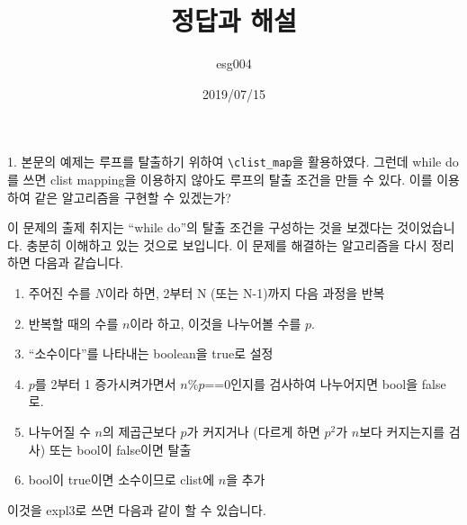 \documentclass[a4paper,amsmath]{oblivoir}
\makeatletter
\let\ATonum\@onum
\makeatother
\begin{document}
\title{정답과 해설}
\author{esg004}
\date{2019/07/15}

\maketitle

\begin{questionp}

 1. 본문의 예제는 루프를 탈출하기 위하여 \verb|\clist_map|을 활용하였다.
그런데 while do를 쓰면 clist mapping을 이용하지 않아도 루프의 탈출 조건을 
만들 수 있다. 이를 이용하여 같은 알고리즘을 구현할 수 있겠는가?
\end{questionp}

이 문제의 출제 취지는 “while do”의 탈출 조건을 구성하는 것을 보겠다는 것이었습니다.
충분히 이해하고 있는 것으로 보입니다. 이 문제를 해결하는 알고리즘을 다시 정리하면 다음과 같습니다.
\begin{enumerate}[\expandafter\ATonum1] \firmlist
\item 주어진 수를 $N$이라 하면, 2부터 N (또는 N-1)까지 다음 과정을 반복
\item 반복할 때의 수를 $n$이라 하고, 이것을 나누어볼 수를 $p$.
\item “소수이다”를 나타내는 boolean을 true로 설정
\item $p$를 2부터 1 증가시켜가면서 $n$\%$p$==0인지를 검사하여 나누어지면 bool을 false로.
\item 나누어질 수 $n$의 제곱근보다 $p$가 커지거나 (다르게 하면 $p^2$가 $n$보다 커지는지를 검사) 또는 bool이 false이면 탈출
\item bool이 true이면 소수이므로 clist에 $n$을 추가
\end{enumerate}

이것을 expl3로 쓰면 다음과 같이 할 수 있습니다.
\end{document}
